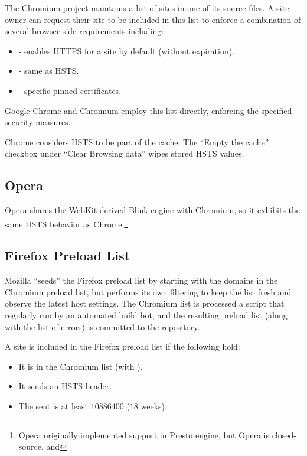 \documentclass{acm_proc_article-sp}
\begin{document}
The Chromium project maintains a list of sites in one of its source files\cite{sts-list}. A site owner can request their site to be included in this list to enforce a combination of several browser-side requirements including:

\begin{itemize}
\item {} - enables HTTPS for a site by default (without expiration).
\item {\iSD} - same as HSTS.
\item {} - specific pinned certificates.
\end{itemize}

Google Chrome and Chromium employ this list directly, enforcing the specified security measures.

Chrome considers HSTS to be part of the cache. The ``Empty the cache'' checkbox under ``Clear Browsing data'' wipes stored HSTS values.

\subsection{Opera}

Opera shares the WebKit-derived Blink engine with Chromium, so it exhibits the same HSTS behavior as Chrome.\footnote{Opera originally implemented support in Presto engine\cite{opera}, but Opera is closed-source, and }

\subsection{Firefox Preload List}

Mozilla ``seeds'' the Firefox preload list by starting with the domains in the Chromium preload list, but performs its own filtering to keep the list fresh and observe the latest host settings. The Chromium list is processed a script\cite{firefox-script} that regularly run \cite{firefox-cron-script} by an automated build bot\cite{firefox-cron}, and the resulting preload list\cite{firefox-list} (along with the list of errors\cite{firefox-errors}) is committed to the  repository.

A site is included in the Firefox preload list if the following hold:

\begin{itemize}
\item It is in the Chromium list (with ).
\item It sends an HSTS header.
\item The  sent is at least $10886400$ ($18$ weeks).
\end{itemize}
\end{document}
